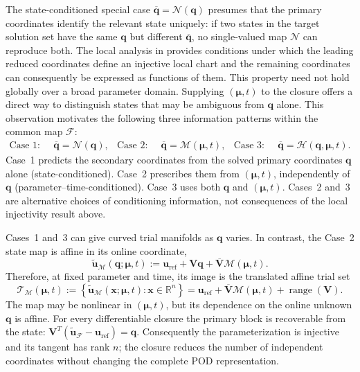 \documentclass[11pt]{article}
\newcommand{\q}{\mathbf q}
\newcommand{\qbar}{\overline{\mathbf q}}
\newcommand{\qp}{\q}
\newcommand{\qs}{\qbar}
\newcommand{\uvec}{\mathbf u}
\newcommand{\utilde}{\widetilde{\mathbf u}}
\newcommand{\mub}{\bm\mu}
\begin{document}
The state-conditioned special case $\qbar=\mathcal N(\q)$ presumes that
the primary coordinates identify the relevant state uniquely: if two
states in the target solution set have the same $\q$ but different
$\qbar$, no single-valued map $\mathcal N$ can reproduce both.  The local
analysis in \cite{aghili2026nonlinear} provides conditions under which the
leading reduced coordinates define an injective local chart and the
remaining coordinates can consequently be expressed as functions of them.
This property need not hold globally over a broad parameter domain.
Supplying $(\mub,t)$ to the closure offers a direct way to distinguish
states that may be ambiguous from $\q$ alone.  This observation motivates
the following three information patterns within the common map
$\mathcal F$:
\begin{align}
\text{Case 1:}\quad&\qs=\mathcal N(\qp),&
\text{Case 2:}\quad&\qs=\mathcal M(\mub,t),&
\text{Case 3:}\quad&\qs=\mathcal H(\qp,\mub,t).
\label{eq:closure-cases}
\end{align}
Case~1 predicts the secondary coordinates from the solved primary
coordinates $\q$ alone (state-conditioned).  Case~2 prescribes them from
$(\mub,t)$, independently of $\q$ (parameter--time-conditioned).
Case~3 uses both $\q$ and $(\mub,t)$.
Cases~2 and~3 are alternative choices of conditioning information, not
consequences of the local injectivity result above.

Cases~1 and~3 can give curved trial manifolds as
$\q$ varies.  In contrast, the Case~2 state map is affine in its online
coordinate,
\begin{equation}
\utilde_{\mathcal M}(\q;\mub,t)
:=\uvec_{\mathrm{ref}}+\mathbf V\q+
\overline{\mathbf V}\mathcal M(\mub,t).
\label{eq:case2-state-map}
\end{equation}
Therefore, at fixed parameter and time, its image is the translated affine
trial set
\begin{equation}
\mathcal T_{\mathcal M}(\mub,t)
:=\left\{\utilde_{\mathcal M}(\mathbf x;\mub,t):
\mathbf x\in\mathbb R^n\right\}
=\uvec_{\mathrm{ref}}+\overline{\mathbf V}\mathcal M(\mub,t)
+\operatorname{range}(\mathbf V).
\label{eq:case2-translated-space}
\end{equation}
The map may be nonlinear in $(\mub,t)$, but its dependence on the online
unknown $\q$ is affine.  For every differentiable closure the primary
block is recoverable from the state:
$\mathbf V^T(\utilde_{\mathcal F}-\uvec_{\mathrm{ref}})=\q$.
Consequently the parameterization is injective and its tangent has rank
$n$; the closure reduces the number of independent coordinates without
changing the complete POD representation.
\end{document}
